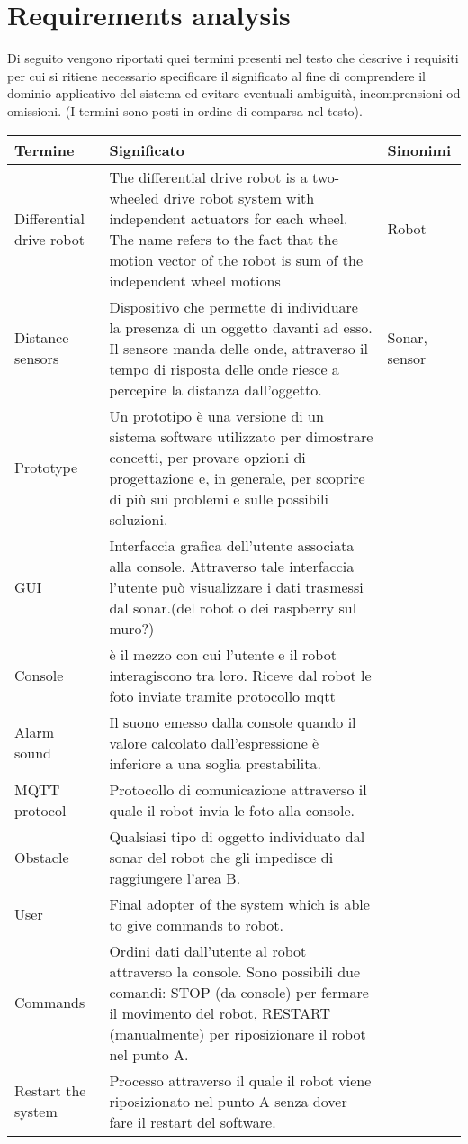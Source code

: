 \documentclass[a4paper]{article}
\begin{document}
\section{Requirements analysis }
Di seguito vengono riportati quei termini presenti nel testo che descrive i requisiti per cui si ritiene necessario specificare il significato al fine di comprendere il dominio applicativo del sistema ed evitare eventuali ambiguità, incomprensioni od omissioni. (I termini sono posti in ordine di comparsa nel testo).

\begin{tabular}{ | m{2cm} | m{10cm}| m{2cm} | }
		\hline
	Termine&Significato&Sinonimi\\ 
	\hline
	Differential drive robot& The differential drive robot is a two-wheeled drive robot system with independent actuators for each wheel. The name refers to the fact that the motion vector of the robot is sum of the independent wheel motions&Robot\\ 
	\hline
	Distance sensors&Dispositivo che permette di individuare la presenza di un oggetto davanti ad esso. Il sensore manda delle onde, attraverso il tempo di risposta delle onde riesce a percepire la distanza dall’oggetto.&Sonar, sensor\\
	\hline
	Prototype&Un prototipo è una versione di un sistema software utilizzato per dimostrare concetti, per provare opzioni di progettazione e, in generale, per scoprire di più sui problemi e sulle possibili soluzioni.&\\
	\hline
	GUI&Interfaccia grafica dell’utente associata alla console. Attraverso tale interfaccia l’utente può visualizzare i dati trasmessi dal sonar.(del robot o dei raspberry sul muro?) & \\
	\hline
	Console&è il mezzo con cui l’utente e il robot interagiscono tra loro. Riceve dal robot le foto inviate tramite protocollo mqtt &\\
	\hline
	Alarm sound&Il suono emesso dalla console quando il valore calcolato dall’espressione è inferiore a una soglia prestabilita.&\\
	\hline
	MQTT protocol&Protocollo di comunicazione attraverso il quale il robot  invia le foto alla console.&\\
	\hline
	Obstacle&Qualsiasi tipo di oggetto individuato dal sonar del robot che gli impedisce di raggiungere l’area B.&\\
	\hline
	User&Final adopter of the system which is able to give commands to robot.&\\
	\hline
	Commands&Ordini dati dall’utente al robot attraverso la console. Sono possibili due comandi: STOP (da console) per fermare il movimento del robot, RESTART (manualmente) per riposizionare il robot nel punto A.&\\
	\hline
	Restart the system&Processo attraverso il quale il robot viene riposizionato nel punto A senza dover fare il restart  del software.&\\
	
\end{tabular}
\end{document}
